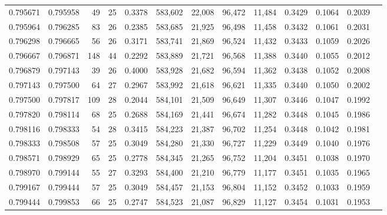 \begin{tabular}{rrrrrrrrrrrrr}
0.795671 & 0.795958 &     49 &    25 &                                     0.3378 & 583,602 &  22,008 &  96,472 &  11,484 & 0.3429 & 0.1064 & 0.2039 \\
0.795964 & 0.796285 &     83 &    26 &                                     0.2385 & 583,685 &  21,925 &  96,498 &  11,458 & 0.3432 & 0.1061 & 0.2031 \\
0.796298 & 0.796665 &     56 &    26 &                                     0.3171 & 583,741 &  21,869 &  96,524 &  11,432 & 0.3433 & 0.1059 & 0.2026 \\
0.796667 & 0.796871 &    148 &    44 &                                     0.2292 & 583,889 &  21,721 &  96,568 &  11,388 & 0.3440 & 0.1055 & 0.2012 \\
0.796879 & 0.797143 &     39 &    26 &                                     0.4000 & 583,928 &  21,682 &  96,594 &  11,362 & 0.3438 & 0.1052 & 0.2008 \\
0.797143 & 0.797500 &     64 &    27 &                                     0.2967 & 583,992 &  21,618 &  96,621 &  11,335 & 0.3440 & 0.1050 & 0.2002 \\
0.797500 & 0.797817 &    109 &    28 &                                     0.2044 & 584,101 &  21,509 &  96,649 &  11,307 & 0.3446 & 0.1047 & 0.1992 \\
0.797820 & 0.798114 &     68 &    25 &                                     0.2688 & 584,169 &  21,441 &  96,674 &  11,282 & 0.3448 & 0.1045 & 0.1986 \\
0.798116 & 0.798333 &     54 &    28 &                                     0.3415 & 584,223 &  21,387 &  96,702 &  11,254 & 0.3448 & 0.1042 & 0.1981 \\
0.798333 & 0.798508 &     57 &    25 &                                     0.3049 & 584,280 &  21,330 &  96,727 &  11,229 & 0.3449 & 0.1040 & 0.1976 \\
0.798571 & 0.798929 &     65 &    25 &                                     0.2778 & 584,345 &  21,265 &  96,752 &  11,204 & 0.3451 & 0.1038 & 0.1970 \\
0.798970 & 0.799144 &     55 &    27 &                                     0.3293 & 584,400 &  21,210 &  96,779 &  11,177 & 0.3451 & 0.1035 & 0.1965 \\
0.799167 & 0.799444 &     57 &    25 &                                     0.3049 & 584,457 &  21,153 &  96,804 &  11,152 & 0.3452 & 0.1033 & 0.1959 \\
0.799444 & 0.799853 &     66 &    25 &                                     0.2747 & 584,523 &  21,087 &  96,829 &  11,127 & 0.3454 & 0.1031 & 0.1953 \\

\end{tabular}
